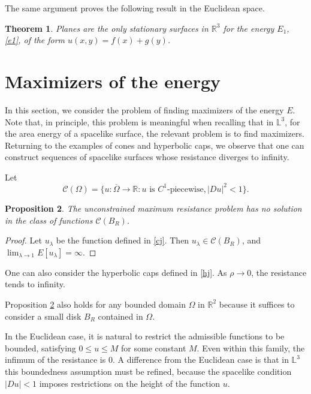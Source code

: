 \documentclass[a4paper,12pt]{amsart}
\newtheorem{theorem}{Theorem}[section]
\newtheorem{proposition}[theorem]{Proposition}
\theoremstyle{definition}
\def\r{\mathbb R}
\def\l{\mathbb L}
\begin{document}
The same argument proves the following result in the Euclidean space.

\begin{theorem}  Planes are the only stationary surfaces in $\r^3$ for the energy $E_1$, \eqref{e1}, of the form $u(x,y)=f(x)+g(y)$.  
\end{theorem}

\section{Maximizers of the energy}\label{s4}

In this section, we consider the problem of finding maximizers of the energy $E$. Note that, in principle, this problem is meaningful when recalling that in $\l^3$, for the area energy of a spacelike surface, the relevant problem is to find maximizers. 
Returning to the examples of cones and hyperbolic caps, we observe that one can construct sequences of  spacelike surfaces whose resistance diverges to infinity. 

Let 
 $$\mathcal{C}(\Omega)=\{u\colon\overline{\Omega}\to\r\colon \mbox{$u$ is  $C^1$-piecewise},  |Du|^2<1\}.$$
 
 
\begin{proposition}\label{pr-u}
The unconstrained maximum resistance problem has no solution in the class of functions $\mathcal{C}(B_R)$.
\end{proposition}

\begin{proof} 
Let $u_\lambda$ be the function defined in \eqref{cj}. Then $u_\lambda\in \mathcal{C}(B_R)$, and $\lim_{\lambda\to 1}E[u_\lambda]=\infty$.
\end{proof}

One can also consider the hyperbolic caps   defined in \eqref{hj}. As $\rho\to 0$, the resistance tends to infinity.  

Proposition \ref{pr-u} also holds for any bounded domain $\Omega$ in $\r^2$ because it suffices to consider a small disk $B_R$ contained in $\Omega$.

 
In the Euclidean case, it is  natural to restrict the admissible functions to be bounded, satisfying  $0\leq u\leq M$ for some  constant $M$. Even within   this family, the infimum of the resistance is $0$. A difference from the Euclidean case is that  in $\l^3$ this   boundedness assumption must be refined, because the spacelike condition $|Du|<1$ imposes restrictions on the height of the function $u$. 
\end{document}
